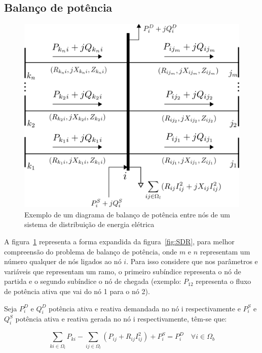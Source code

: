 \subsection{Balanço de potência}

\begin{figure}[H]
    \centering
    \includegraphics[scale = 1.4]{01_img/diagrama_potencia.png}
    \caption{Exemplo de um diagrama de balanço de potência entre nós de um sistema de distribuição de energia elétrica}
    \label{fig:balanco_pot}
\end{figure}

A figura~\ref{fig:balanco_pot} representa a forma expandida da figura~\ref{fig:SDR}, para melhor compreensão do problema de balanço de potência, onde $m$ e $n$ representam um número qualquer de nós ligados ao nó $i$. 
Para isso considere que nos parâmetros e variáveis que representam um ramo, o primeiro subíndice representa o nó de partida e o segundo subíndice o nó de chegada (exemplo: $P_{12}$ representa o fluxo de potência ativa que vai do nó 1 para o nó 2).

Seja $P_{i}^{D}$ e $Q_{i}^{D}$ potência ativa e reativa demandada no nó i respectivamente e $P_{i}^{S}$ e $Q_{i}^{S}$ potência ativa e reativa gerada no nó i respectivamente, têm-se que:

\begin{equation*}
    \sum_{ki\in\Omega_{l}}P_{ki} - \sum_{ij\in\Omega_{l}}(P_{ij} + R_{ij}I_{ij}^{2}) + P_{i}^{S} = P_{i}^{D}\quad\forall i \in\Omega_{b}
\end{equation*}

